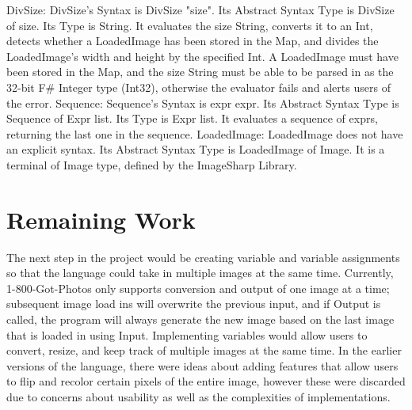 \documentclass{article}
\begin{document}
\vskip 0.2in
DivSize: DivSize's Syntax is DivSize "size". Its Abstract Syntax Type is DivSize of size. Its Type is String. It evaluates the size String, converts it to an Int, detects whether a LoadedImage has been stored in the Map, and divides the LoadedImage's width and height by the specified Int. A LoadedImage must have been stored in the Map, and the size String must be able to be parsed in as the 32-bit F\#  Integer type (Int32), otherwise the evaluator fails and alerts users of the error.
\vskip 0.2in
Sequence: Sequence's Syntax is expr expr. Its Abstract Syntax Type is Sequence of Expr list. Its Type is Expr list. It evaluates a sequence of exprs, returning the last one in the sequence.
\vskip 0.2in
LoadedImage: LoadedImage does not have an explicit syntax. Its Abstract Syntax Type is LoadedImage of Image. It is a terminal of Image type, defined by the ImageSharp Library. 

\section{Remaining Work}
The next step in the project would be creating variable and variable assignments so that the language could take in multiple images at the same time. Currently, 1-800-Got-Photos only supports conversion and output of one image at a time; subsequent image load ins will overwrite the previous input, and if Output is called, the program will always generate the new image based on the last image that is loaded in using Input. Implementing variables would allow users to convert, resize, and keep track of multiple images at the same time. In the earlier versions of the language, there were ideas about adding features that allow users to flip and recolor certain pixels of the entire image, however these were discarded due to concerns about usability as well as the complexities of implementations. 
\end{document}
